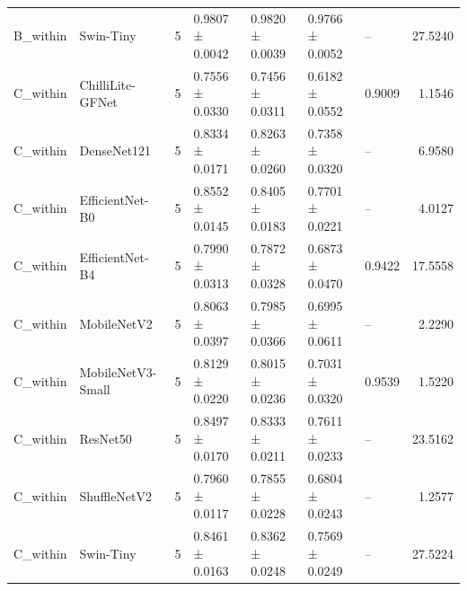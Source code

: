 \begin{tabular}{llrllllr}
B\_within & Swin-Tiny & 5 & 0.9807 ± 0.0042 & 0.9820 ± 0.0039 & 0.9766 ± 0.0052 & -- & 27.5240 \\
C\_within & ChilliLite-GFNet & 5 & 0.7556 ± 0.0330 & 0.7456 ± 0.0311 & 0.6182 ± 0.0552 & 0.9009 & 1.1546 \\
C\_within & DenseNet121 & 5 & 0.8334 ± 0.0171 & 0.8263 ± 0.0260 & 0.7358 ± 0.0320 & -- & 6.9580 \\
C\_within & EfficientNet-B0 & 5 & 0.8552 ± 0.0145 & 0.8405 ± 0.0183 & 0.7701 ± 0.0221 & -- & 4.0127 \\
C\_within & EfficientNet-B4 & 5 & 0.7990 ± 0.0313 & 0.7872 ± 0.0328 & 0.6873 ± 0.0470 & 0.9422 & 17.5558 \\
C\_within & MobileNetV2 & 5 & 0.8063 ± 0.0397 & 0.7985 ± 0.0366 & 0.6995 ± 0.0611 & -- & 2.2290 \\
C\_within & MobileNetV3-Small & 5 & 0.8129 ± 0.0220 & 0.8015 ± 0.0236 & 0.7031 ± 0.0320 & 0.9539 & 1.5220 \\
C\_within & ResNet50 & 5 & 0.8497 ± 0.0170 & 0.8333 ± 0.0211 & 0.7611 ± 0.0233 & -- & 23.5162 \\
C\_within & ShuffleNetV2 & 5 & 0.7960 ± 0.0117 & 0.7855 ± 0.0228 & 0.6804 ± 0.0243 & -- & 1.2577 \\
C\_within & Swin-Tiny & 5 & 0.8461 ± 0.0163 & 0.8362 ± 0.0248 & 0.7569 ± 0.0249 & -- & 27.5224 \\
\bottomrule
\end{tabular}
